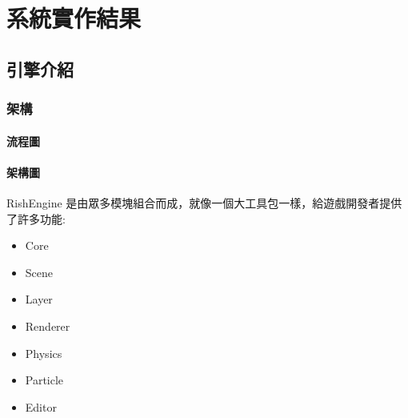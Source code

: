 \chapter{系統實作結果}

\section{引擎介紹}

\subsection{架構}
\label{sub:架構}

\subsubsection{流程圖} %
\label{ssub:流程圖}



\subsubsection{架構圖} %
\label{ssub:架構圖}

RishEngine 是由眾多模塊組合而成，就像一個大工具包一樣，給遊戲開發者提供了許多功能:

\begin{itemize}
\item{Core}
\item{Scene}
\item{Layer}
\item{Renderer}
\item{Physics}
\item{Particle}
\item{Editor}
\end{itemize}


